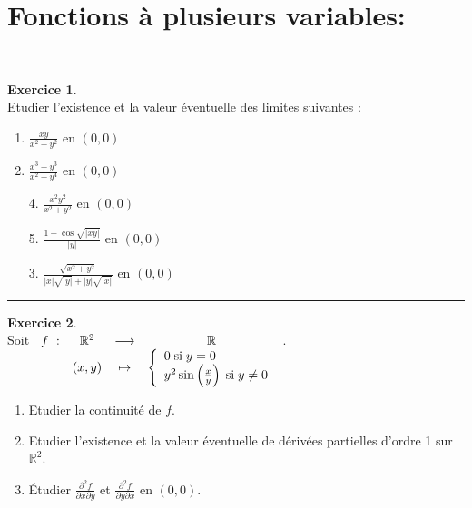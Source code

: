 \documentclass[a4paper,10pt]{article}
\theoremstyle{definition}
\theoremstyle{definition}
\newtheorem{exo}{Exercice}
\newcommand{\R}{\mathbb{R}}
\begin{document}
\section*{Fonctions à plusieurs variables:}\hfill\\%
\begin{minipage}{1\linewidth}
	\begin{minipage}[t]{0.48\linewidth}
		\raggedright
		
		\begin{exo}\quad\\[0.2cm]
			Etudier l'existence et la valeur éventuelle des limites suivantes :
			\begin{multicols}{2}
				\begin{enumerate}
					\item  $ \frac{xy}{x^2+y^2}$ en $(0,0)$
					
					\item  $ \frac{x^3+y^3}{x^2+y^4}$  en $(0,0)$
					
					
					\item[4.]  $ \frac{x^2y^2}{x^2+y^2}$ en $(0,0)$
					\item[5.]   $ \frac{1-\cos\sqrt{|xy|}}{|y|}$ en $(0,0)$	
				\end{enumerate}

			\end{multicols}
			\begin{enumerate}
				\item[3.]  $ \frac{\sqrt{x^2+y^2}}{|x|\sqrt{|y|}+|y|\sqrt{|x|}}$  en $(0,0)$
			\end{enumerate}
			\centering
			\rule{1\linewidth}{0.6pt}
		\end{exo}
	
	\begin{exo}\quad\\[0.2cm]
		Soit $\begin{array}[t]{cccc}f~:&\R^2&\longrightarrow&\R\\
		&(x,y)&\mapsto&\left\{
		\begin{array}{l}
		0\;\text{si}\;y=0\\
		y^2\sin\left(\frac{x}{y}\right)\;\text{si}\;y\neq0
		\end{array}
		\right.
		\end{array}
		$.
		\begin{enumerate}
			\item  Etudier la continuité de $f$.
			
			\item  Etudier l'existence et la valeur éventuelle de dérivées partielles d'ordre 1 sur $\R^2$.
			\item Étudier $\frac{\partial^2f}{\partial x\partial y}$ et $\frac{\partial^2f}{\partial y\partial x}$ en $(0,0)$.
		\end{enumerate}
		

\end{exo}
\end{minipage}
\end{minipage}
\end{document}
